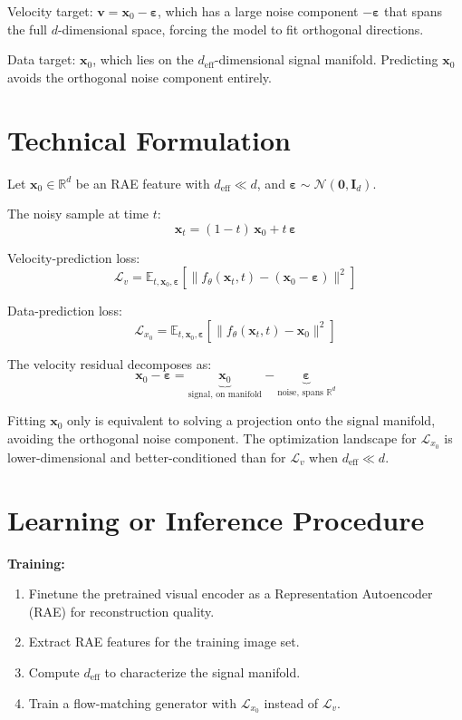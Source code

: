 \documentclass[10pt,twocolumn]{article}
\begin{document}
Velocity target: $\mathbf{v} = \mathbf{x}_0 - \boldsymbol{\varepsilon}$,
which has a large noise component $-\boldsymbol{\varepsilon}$ that spans the
full $d$-dimensional space, forcing the model to fit orthogonal directions.

Data target: $\mathbf{x}_0$, which lies on the $d_\text{eff}$-dimensional
signal manifold. Predicting $\mathbf{x}_0$ avoids the orthogonal noise
component entirely.

\section{Technical Formulation}

Let $\mathbf{x}_0 \in \mathbb{R}^d$ be an RAE feature with
$d_\text{eff} \ll d$, and $\boldsymbol{\varepsilon} \sim \mathcal{N}(\mathbf{0},
\mathbf{I}_d)$.

The noisy sample at time $t$:
\[
\mathbf{x}_t = (1-t)\,\mathbf{x}_0 + t\,\boldsymbol{\varepsilon}
\]

Velocity-prediction loss:
\[
\mathcal{L}_v = \mathbb{E}_{t,\mathbf{x}_0,\boldsymbol{\varepsilon}}\!\left[
  \|f_\theta(\mathbf{x}_t, t) - (\mathbf{x}_0 - \boldsymbol{\varepsilon})\|^2
\right]
\]

Data-prediction loss:
\[
\mathcal{L}_{x_0} = \mathbb{E}_{t,\mathbf{x}_0,\boldsymbol{\varepsilon}}\!\left[
  \|f_\theta(\mathbf{x}_t, t) - \mathbf{x}_0\|^2
\right]
\]

The velocity residual decomposes as:
\[
\mathbf{x}_0 - \boldsymbol{\varepsilon}
= \underbrace{\mathbf{x}_0}_{\text{signal, on manifold}}
  - \underbrace{\boldsymbol{\varepsilon}}_{\text{noise, spans } \mathbb{R}^d}
\]

Fitting $\mathbf{x}_0$ only is equivalent to solving a projection onto the
signal manifold, avoiding the orthogonal noise component. The optimization
landscape for $\mathcal{L}_{x_0}$ is lower-dimensional and better-conditioned
than for $\mathcal{L}_v$ when $d_\text{eff} \ll d$.

\section{Learning or Inference Procedure}

\textbf{Training:}
\begin{enumerate}[itemsep=2pt,parsep=0pt]
  \item Finetune the pretrained visual encoder as a Representation
    Autoencoder (RAE) for reconstruction quality.
  \item Extract RAE features for the training image set.
  \item Compute $d_\text{eff}$ to characterize the signal manifold.
  \item Train a flow-matching generator with $\mathcal{L}_{x_0}$ instead
    of $\mathcal{L}_v$.
\end{enumerate}
\end{document}
